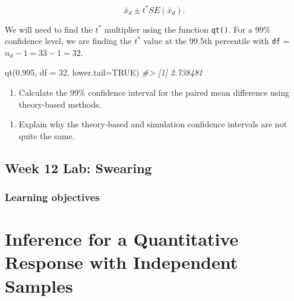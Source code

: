 \documentclass[
]{report}
\newenvironment{Shaded}{\begin{snugshade}}{\end{snugshade}}
\newcommand{\AttributeTok}[1]{\textcolor[rgb]{0.77,0.63,0.00}{#1}}
\newcommand{\CommentTok}[1]{\textcolor[rgb]{0.56,0.35,0.01}{\textit{#1}}}
\newcommand{\ConstantTok}[1]{\textcolor[rgb]{0.00,0.00,0.00}{#1}}
\newcommand{\DecValTok}[1]{\textcolor[rgb]{0.00,0.00,0.81}{#1}}
\newcommand{\FloatTok}[1]{\textcolor[rgb]{0.00,0.00,0.81}{#1}}
\newcommand{\FunctionTok}[1]{\textcolor[rgb]{0.00,0.00,0.00}{#1}}
\newcommand{\NormalTok}[1]{#1}
\providecommand{\tightlist}{%
  \setlength{\itemsep}{0pt}\setlength{\parskip}{0pt}}
\begin{document}
\[\bar{x}_d\pm t^* SE(\bar{x}_d).\]

We will need to find the \(t^*\) multiplier using the function \texttt{qt()}. For a 99\% confidence level, we are finding the \(t^*\) value at the 99.5th percentile with \texttt{df} = \(n_d - 1 = 33 - 1 = 32\).

\begin{Shaded}
\begin{Highlighting}[]
\FunctionTok{qt}\NormalTok{(}\FloatTok{0.995}\NormalTok{, }\AttributeTok{df =} \DecValTok{32}\NormalTok{, }\AttributeTok{lower.tail=}\ConstantTok{TRUE}\NormalTok{)}
\CommentTok{\#\textgreater{} [1] 2.738481}
\end{Highlighting}
\end{Shaded}

\begin{enumerate}
\def\labelenumi{\arabic{enumi}.}
\setcounter{enumi}{4}
\tightlist
\item
  Calculate the 99\% confidence interval for the paired mean difference using theory-based methods.
\end{enumerate}

\vspace{1in}

\begin{enumerate}
\def\labelenumi{\arabic{enumi}.}
\setcounter{enumi}{5}
\tightlist
\item
  Explain why the theory-based and simulation confidence intervals are not quite the same.
\end{enumerate}

\vspace{1in}

\newpage

\hypertarget{week-12-lab-swearing}{%
\section{Week 12 Lab: Swearing}\label{week-12-lab-swearing}}


\hypertarget{learning-objectives-18}{%
\subsection{Learning objectives}\label{learning-objectives-18}}

\newpage

\hypertarget{inference-for-a-quantitative-response-with-independent-samples}{%
\chapter{Inference for a Quantitative Response with Independent Samples}\label{inference-for-a-quantitative-response-with-independent-samples}}
\end{document}

